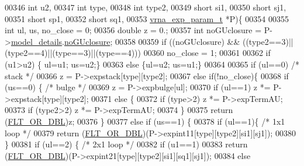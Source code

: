 \begin{DoxyCode}
00346               \textcolor{keywordtype}{int} u2,
00347               \textcolor{keywordtype}{int} type,
00348               \textcolor{keywordtype}{int} type2,
00349               \textcolor{keywordtype}{short} si1,
00350               \textcolor{keywordtype}{short} sj1,
00351               \textcolor{keywordtype}{short} sp1,
00352               \textcolor{keywordtype}{short} sq1,
00353               \hyperlink{group__energy__parameters_structvrna__exp__param__s}{vrna\_exp\_param\_t} *P)\{
00354 
00355   \textcolor{keywordtype}{int} ul, us, no\_close = 0;
00356   \textcolor{keywordtype}{double} z = 0.;
00357   \textcolor{keywordtype}{int} noGUclosure = P->\hyperlink{group__energy__parameters_ac18055127bccc27c1223f1d2f3b01b53}{model\_details}.\hyperlink{structvrna__md__s_a7e883db1f33f8f3baa5c9b140350c78e}{noGUclosure};
00358 
00359   \textcolor{keywordflow}{if} ((noGUclosure) && ((type2==3)||(type2==4)||(type==3)||(type==4)))
00360     no\_close = 1;
00361 
00362   \textcolor{keywordflow}{if} (u1>u2) \{ ul=u1; us=u2;\}
00363   \textcolor{keywordflow}{else} \{ul=u2; us=u1;\}
00364 
00365   \textcolor{keywordflow}{if} (ul==0) \textcolor{comment}{/* stack */}
00366     z = P->expstack[type][type2];
00367   \textcolor{keywordflow}{else} \textcolor{keywordflow}{if}(!no\_close)\{
00368     \textcolor{keywordflow}{if} (us==0) \{                      \textcolor{comment}{/* bulge */}
00369       z = P->expbulge[ul];
00370       \textcolor{keywordflow}{if} (ul==1) z *= P->expstack[type][type2];
00371       \textcolor{keywordflow}{else} \{
00372         \textcolor{keywordflow}{if} (type>2) z *= P->expTermAU;
00373         \textcolor{keywordflow}{if} (type2>2) z *= P->expTermAU;
00374       \}
00375       \textcolor{keywordflow}{return} (\hyperlink{group__data__structures_ga31125aeace516926bf7f251f759b6126}{FLT\_OR\_DBL})z;
00376     \}
00377     \textcolor{keywordflow}{else} \textcolor{keywordflow}{if} (us==1) \{
00378       \textcolor{keywordflow}{if} (ul==1)\{                    \textcolor{comment}{/* 1x1 loop */}
00379         \textcolor{keywordflow}{return} (\hyperlink{group__data__structures_ga31125aeace516926bf7f251f759b6126}{FLT\_OR\_DBL})(P->expint11[type][type2][si1][sj1]);
00380       \}
00381       \textcolor{keywordflow}{if} (ul==2) \{                  \textcolor{comment}{/* 2x1 loop */}
00382         \textcolor{keywordflow}{if} (u1==1)
00383           \textcolor{keywordflow}{return} (\hyperlink{group__data__structures_ga31125aeace516926bf7f251f759b6126}{FLT\_OR\_DBL})(P->expint21[type][type2][si1][sq1][sj1]);
00384         \textcolor{keywordflow}{else}

\end{DoxyCode}
